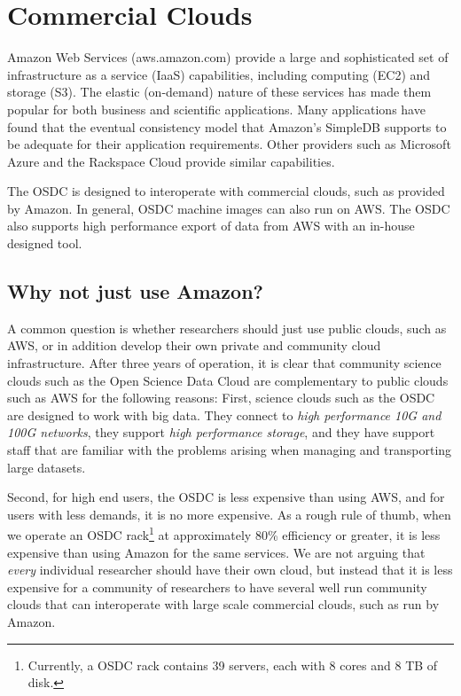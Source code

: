 \documentclass[11pt,twocolumn]{article}
\begin{document}
\section{Commercial Clouds}

Amazon Web Services (aws.amazon.com) provide a
large and sophisticated set of infrastructure as a service (IaaS)
capabilities, including computing (EC2) and storage (S3). The elastic
(on-demand) nature of these services has made them popular for both
business and scientific applications.  Many applications have found
that the eventual consistency model \cite{DeCandia:2007} that Amazon's
SimpleDB supports to be adequate for their application requirements.
Other providers such as Microsoft Azure and the Rackspace Cloud
provide similar capabilities.

The OSDC is designed to interoperate with commercial clouds, such as
provided by Amazon.   In general, OSDC machine images can also run on
AWS.  The OSDC also supports high performance export of data from AWS
with an in-house designed tool.


\subsection{Why not just use Amazon?}  A common question is whether
researchers should just use public clouds, such as AWS, or in addition
develop their own private and community cloud infrastructure.  After
three years of operation, it is clear that community science clouds
such as the Open Science Data Cloud are complementary to public
clouds such as AWS for the following reasons: First, science clouds
such as the OSDC are designed to work with big data.  They connect to
{\em high performance 10G and 100G networks}, they support {\em high
  performance storage}, and they have support staff that are familiar
with the problems arising when managing and transporting large
datasets.

Second, for high end users, the OSDC is
less expensive than using AWS, and for users with less demands, it is
no more expensive.  As a rough rule of thumb, when we operate an OSDC
rack\footnote{Currently, a OSDC rack contains 39 servers, each with 8
  cores and 8 TB of disk.} at approximately 80\% efficiency or greater, it is less
expensive than using Amazon for the same services.  We are not arguing
that {\em every} individual researcher should have their own cloud, but instead
that it is less expensive for a community of researchers to have
several well run community clouds that can interoperate with large
scale commercial clouds, such as run by Amazon.
\end{document}

